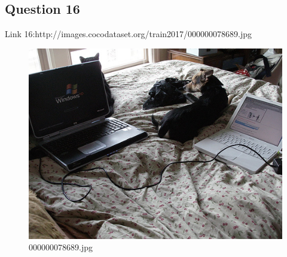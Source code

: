 \subsection*{Question 16}
Link 16:http://images.cocodataset.org/train2017/000000078689.jpg
    \begin{figure}[h]
        \centering
        \includegraphics[width=0.8\linewidth]{../image set/easy/000000078689.jpg}
        \caption{000000078689.jpg}
    \end{figure}

